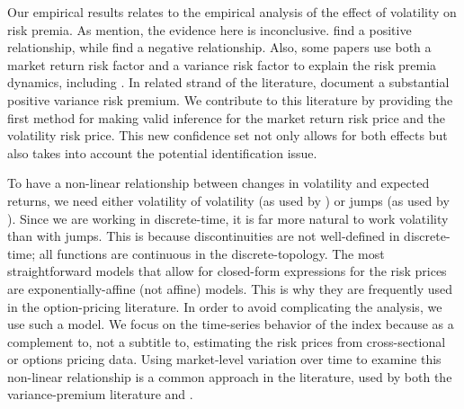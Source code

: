 Our empirical results relates to the empirical analysis of the effect of volatility on risk premia. As \textcite{lettau2010measuring} mention,  the evidence here is inconclusive. \textcites{bollerslev1988capital, harvey1989timevarying, ghysels2005there, bali2006there, ludvigson2007empirical} find a positive relationship, while \textcites{campbell1987stock, breen1989economic, pagan1991nonparametric, whitelaw1994time, brandt2004relationship} find a negative relationship. Also, some papers use both a market return risk factor and a variance risk factor to explain the risk premia dynamics, including \textcites{christoffersen2013capturing, feunou2014risk, dewbecker2017price}. In related strand of the literature, \textcite{bollerslev2008risk, drechsler2011whats} document a substantial positive variance risk premium. We contribute to this literature by providing the first method for making valid inference for the market return risk price and the volatility risk price. This new confidence set not only allows for both effects but also takes into account the potential identification issue.

To have a non-linear relationship between changes in volatility and expected returns, we need either volatility of volatility (as used by \textcite{drechsler2011whats}) or jumps (as used by \textcite{drechsler2014uncertainty}).   Since we are working in discrete-time, it is far more natural to work volatility than with jumps. This is because discontinuities are not well-defined in discrete-time; all functions are continuous in the discrete-topology. The most straightforward models that allow for closed-form expressions for the risk prices are exponentially-affine (not affine) models. This is why they are frequently used  in the option-pricing literature.  In order to avoid complicating the analysis, we use such a model. We focus on the time-series behavior of the index because as a complement to, not a subtitle to, estimating the risk prices from cross-sectional or options pricing data. Using market-level variation over time to examine this non-linear relationship is a common approach in the literature, used by both the variance-premium literature and \textcite{han2018leverage}.  



